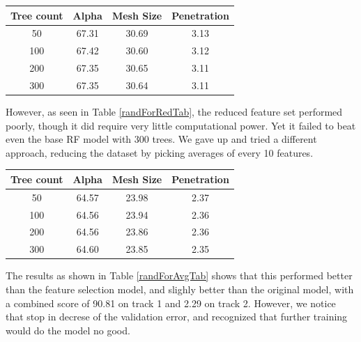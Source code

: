 \documentclass[a4paper, 12pt]{article}
\begin{document}
\begin{multicols}{2}
                
                \begin{center}
                    \begin{tabular}{c|ccc}
                        Tree count & Alpha & Mesh Size & Penetration\\
                        \hline
                        50 & 67.31 & 30.69 & 3.13 \\
                        100 & 67.42 & 30.60 & 3.12 \\
                        200 & 67.35 & 30.65 & 3.11 \\
                        300 & 67.35 & 30.64 & 3.11 \\
                    \end{tabular}
                    \label{randForRedTab}
                \end{center}

                However, as seen in Table \ref{randForRedTab}, the reduced feature set performed poorly, though it did require very little computational power. Yet it failed to beat even the base RF model with 300 trees. We gave up and tried a different approach, reducing the dataset by picking averages of every 10 features.

                
                \begin{center}
                    \begin{tabular}{c|ccc}
                        Tree count & Alpha & Mesh Size & Penetration\\
                        \hline
                        50 & 64.57 & 23.98 & 2.37 \\
                        100 & 64.56 & 23.94 & 2.36 \\
                        200 & 64.56 & 23.86 & 2.36 \\
                        300 & 64.60 & 23.85 & 2.35 \\
                    \end{tabular}
                    \label{randForAvgTab}
                \end{center}

                The results as shown in Table \ref{randForAvgTab} shows that this performed better than the feature selection model, and slighly better than the original model, with a combined score of 90.81 on track 1 and 2.29 on track 2. However, we notice that stop in decrese of the validation error, and recognized that further training would do the model no good.


\end{multicols}
\end{document}
